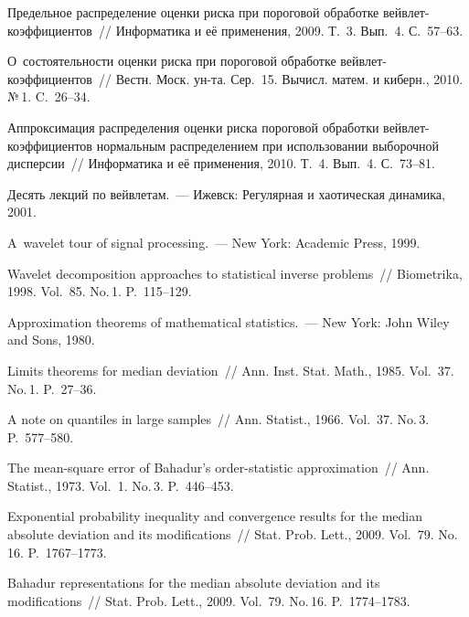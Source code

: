 \begin{multicols}{2}
{{\begin{thebibliography}{99}
 Предельное распределение оценки риска при
пороговой обработке вейвлет-ко\-эф\-фи\-ци\-ен\-тов~// Информатика и её
применения, 2009. Т.~3. Вып.~4. С.~57--63.

 О~состоятельности оценки
риска при пороговой обработке вейвлет-ко\-эф\-фи\-ци\-ен\-тов~// Вестн. Моск.
ун-та. Сер.~15. Вычисл. матем. и киберн., 2010. №\,1. C.~26--34.

 Аппроксимация распределения оценки риска
пороговой обработки вейвлет-ко\-эф\-фи\-ци\-ен\-тов нормальным распределением
при использовании выборочной дисперсии~// Информатика и её
применения, 2010. Т.~4. Вып.~4. С.~73--81.

 Десять лекций по вейвлетам.~--- Ижевск: Регулярная и хаотическая динамика, 2001.

 A~wavelet tour of signal processing.~--- New York: Academic Press, 1999.

 Wavelet decomposition
approaches to statistical inverse problems~// Biometrika, 1998.
Vol.~85. No.\,1. P.~115--129.

 Approximation theorems of mathematical
statistics.~--- New York: John Wiley and Sons, 1980.

 Limits theorems for median
deviation~// Ann. Inst. Stat. Math.,
1985. Vol.~37. No.\,1. P.~27--36.

 A note on quantiles in large samples~//
Ann. Statist., 1966. Vol.~37. No.\,3. P.~577--580.

 The mean-square error of Bahadur's
order-statistic approximation~// Ann. Statist., 1973. Vol.~1. No.\,3. P.~446--453.


 Exponential probability inequality and convergence results for
the median absolute deviation and its modifications~// Stat. Prob. Lett.,
2009. Vol.~79. No.\,16. P.~1767--1773.

 Bahadur representations for the median absolute deviation
and its modifications~// Stat. Prob. Lett., 2009. Vol.~79. No.\,16.
P.~1774--1783.



\end{thebibliography}}}
\end{multicols}
